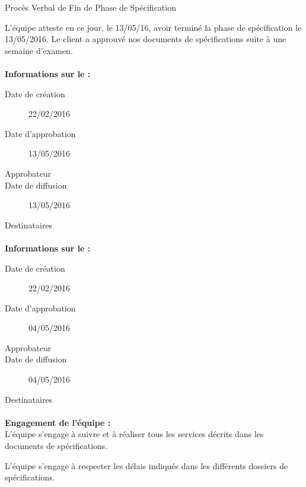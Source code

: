 \documentclass[asi, sansVersion]{picInsa}
\begin{document}
 
 \begin{center}
  \LARGE{}
    Procès Verbal de Fin de Phase de Spécification\\
 \end{center}
 
 \normalsize{}
 
L'équipe \nomEquipe{} atteste en ce jour, le 13/05/16, avoir terminé la phase de spécification le 13/05/2016.
Le client a approuvé nos documents de spécifications suite à une semaine d'examen.


\paragraph{}
\textbf{Informations sur le \DSECourt{} :}

\begin{description}
  \item[Date de création]22/02/2016
  \item[Date d'approbation]13/05/2016
  \item[Approbateur]\nomClient
  \item[Date de diffusion]13/05/2016
  \item[Destinataires]\nomEquipe
\end{description}

\paragraph{}
\textbf{Informations sur le \PTVCourt :}

\begin{description}
  \item[Date de création]22/02/2016
  \item[Date d'approbation]04/05/2016
  \item[Approbateur]\nomClient
  \item[Date de diffusion]04/05/2016
  \item[Destinataires]\nomEquipe
\end{description}

\paragraph{}
\textbf{Engagement de l'équipe :}\\


L'équipe \nomEquipe{} s'engage à suivre et à réaliser tous les services décrits dans les documents de spécifications.


L'équipe \nomEquipe{} s'engage à respecter les délais indiqués dans les différents dossiers de spécifications.
\end{document}
